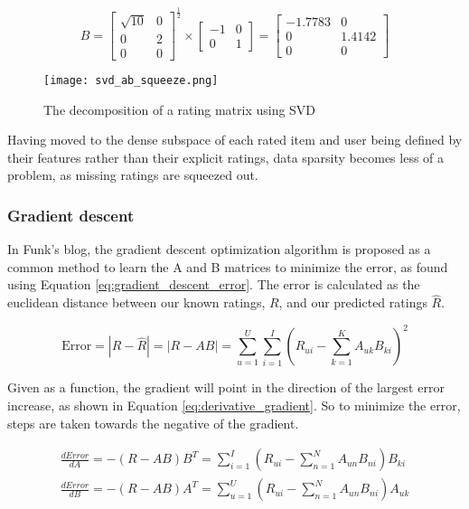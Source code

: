 \begin{equation}\label{eq:svd_AB_num_squeezing_B}
B = \begin{bmatrix}
\sqrt{10} & 0\\ 
0 & 2\\ 
0 & 0
\end{bmatrix}^{\frac{1}{2}} \times
\begin{bmatrix}
-1 & 0\\ 
0 & 1
\end{bmatrix} =
\begin{bmatrix}
-1.7783 & 0\\ 
0 & 1.4142\\ 
0 & 0
\end{bmatrix}
\end{equation}

\begin{figure}[H]
	\centering
	\texttt{[image: svd\_ab\_squeeze.png]}
	\caption{The decomposition of a rating matrix using SVD}
	\label{fig:svdSqueeze}
\end{figure}
Having moved to the dense subspace of each rated item and user being defined by their features rather than their explicit ratings, data sparsity becomes less of a problem, as missing ratings are squeezed out.

\subsubsection{Gradient descent}
In Funk's blog, the gradient descent optimization algorithm is proposed as a common method to learn the A and B matrices to minimize the error, as found using Equation \ref{eq:gradient_descent_error}. The error is calculated as the euclidean distance between our known ratings, $R$, and our predicted ratings $\hat{R}$.

\begin{equation}\label{eq:gradient_descent_error}
\text{Error} = |R-\hat{R}| = |R - AB| = \sum_{u=1}^{U}\sum_{i=1}^{I}\left (R_{ui}- \sum_{k=1}^{K} A_{uk}B_{ki} \right )^2
\end{equation}

Given as a function, the gradient will point in the direction of the largest error increase, as shown in Equation \ref{eq:derivative_gradient}. So to minimize the error, steps are taken towards the negative of the gradient.

\begin{equation}\label{eq:derivative_gradient}
	\begin{split}
	\frac{dError}{dA}=-(R-AB)B^T = \sum_{i=1}^{I}(R_{ui} - \sum_{n=1}^{N} A_{un}B_{ni})B_{ki}
	\\
	\frac{dError}{dB}=-(R-AB)A^T = \sum_{u=1}^{U}(R_{ui} - \sum_{n=1}^{N} A_{un}B_{ni})A_{uk}
	\end{split}
\end{equation}


